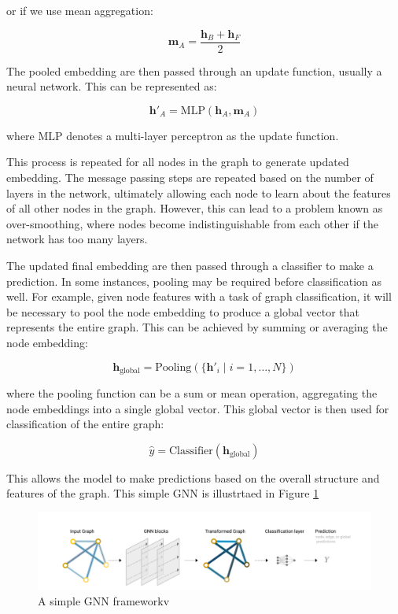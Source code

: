 or if we use mean aggregation:

\[
\mathbf{m}_A = \frac{\mathbf{h}_B + \mathbf{h}_F}{2}
\]

The pooled embedding are then passed through an update function, usually a neural network. This can be represented as:

\[
\mathbf{h}'_A = \text{MLP}(\mathbf{h}_A, \mathbf{m}_A)
\]

where \( \text{MLP} \) denotes a multi-layer perceptron as the update function.

This process is repeated for all nodes in the graph to generate updated embedding. The message passing steps are repeated based on the number of layers in the network, ultimately allowing each node to learn about the features of all other nodes in the graph. However, this can lead to a problem known as over-smoothing, where nodes become indistinguishable from each other if the network has too many layers.

The updated final embedding are then passed through a classifier to make a prediction. In some instances, pooling may be required before classification as well. For example, given node features with a task of graph classification, it will be necessary to pool the node embedding to produce a global vector that represents the entire graph. This can be achieved by summing or averaging the node embedding:

\[
\mathbf{h}_{\text{global}} = \text{Pooling}(\{\mathbf{h}'_i \mid i = 1, \ldots, N\})
\]

where the pooling function can be a sum or mean operation, aggregating the node embeddings into a single global vector. This global vector is then used for classification of the entire graph:

\[
\hat{y} = \text{Classifier}(\mathbf{h}_{\text{global}})
\]

This allows the model to make predictions based on the overall structure and features of the graph. This simple GNN is illustrtaed in Figure \ref{fig:Simple GNN}
\begin{figure}
    \centering
    \includegraphics[width=1\linewidth]{images/general gnn.PNG}
    \caption{ A simple GNN frameworkv\cite{sanchez-lengeling_gentle_2021}}
    \label{fig:Simple GNN}
\end{figure}



